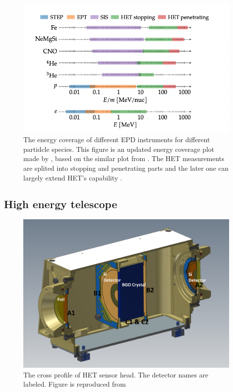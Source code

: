 \begin{figure}
    \centering
    \includegraphics[width = \textwidth]{images/EPD_coverage.png}
    \caption[The energy coverage of \ac{EPD} instruments]{The energy coverage of different \ac{EPD} instruments for different partidcle species. This figure is an updated energy coverage plot made by \citep{JohanPhd2020}, based on the similar plot from \citep{RodriguezPacheco-2019-EPD}. The HET measurements are splited into stopping and penetrating parts and the later one can largely extend \ac{HET}'s capability \citep{Elftmann-2020-PhD}.}
    \label{Fig:EPD-energy-coverage}
\end{figure}  

\subsection{High energy telescope}

\begin{figure}
    \centering
    \includegraphics[width = \textwidth]{images/het.png}
    \caption[The \ac{HET} sensor head]{The cross profile of HET sensor head. The detector names are labeled. Figure is reproduced from \citep{RodriguezPacheco-2019-EPD}}
    \label{fig:HET-sensor-head}
\end{figure}

